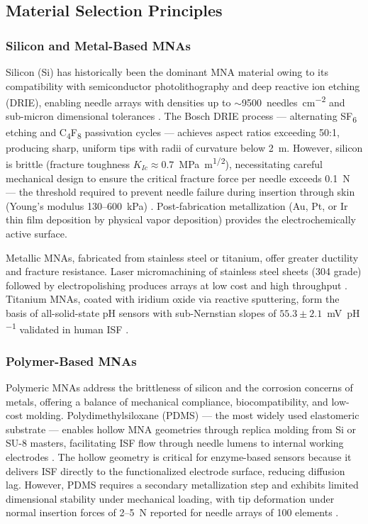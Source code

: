 \documentclass[review,1p]{elsarticle}
\begin{document}
\subsection{Material Selection Principles}
\label{subsec:materials}

\subsubsection{Silicon and Metal-Based MNAs}

Silicon (Si) has historically been the dominant MNA material owing to its compatibility with semiconductor photolithography and deep reactive ion etching (DRIE), enabling needle arrays with densities up to $\sim$9500~needles~cm\textsuperscript{$-2$} and sub-micron dimensional tolerances \cite{Dervisevic2021}. The Bosch DRIE process — alternating SF\textsubscript{6} etching and C\textsubscript{4}F\textsubscript{8} passivation cycles — achieves aspect ratios exceeding 50:1, producing sharp, uniform tips with radii of curvature below 2~\textmu{}m. However, silicon is brittle (fracture toughness $K_{Ic} \approx 0.7$~MPa~m\textsuperscript{1/2}), necessitating careful mechanical design to ensure the critical fracture force per needle exceeds 0.1~N — the threshold required to prevent needle failure during insertion through skin (Young's modulus 130--600~kPa) \cite{Yan2023Fracture}. Post-fabrication metallization (Au, Pt, or Ir thin film deposition by physical vapor deposition) provides the electrochemically active surface.

Metallic MNAs, fabricated from stainless steel or titanium, offer greater ductility and fracture resistance. Laser micromachining of stainless steel sheets (304 grade) followed by electropolishing produces arrays at low cost and high throughput \cite{Calio2021}. Titanium MNAs, coated with iridium oxide via reactive sputtering, form the basis of all-solid-state pH sensors with sub-Nernstian slopes of $55.3 \pm 2.1$~mV~pH\textsuperscript{$-1$} validated in human ISF \cite{Fogh-Andersen2022, GarciaGuzman2021}.

\subsubsection{Polymer-Based MNAs}

Polymeric MNAs address the brittleness of silicon and the corrosion concerns of metals, offering a balance of mechanical compliance, biocompatibility, and low-cost molding. Polydimethylsiloxane (PDMS) — the most widely used elastomeric substrate — enables hollow MNA geometries through replica molding from Si or SU-8 masters, facilitating ISF flow through needle lumens to internal working electrodes \cite{Parrilla2022}. The hollow geometry is critical for enzyme-based sensors because it delivers ISF directly to the functionalized electrode surface, reducing diffusion lag. However, PDMS requires a secondary metallization step and exhibits limited dimensional stability under mechanical loading, with tip deformation under normal insertion forces of 2--5~N reported for needle arrays of 100 elements \cite{Yan2023Fracture}.
\end{document}
